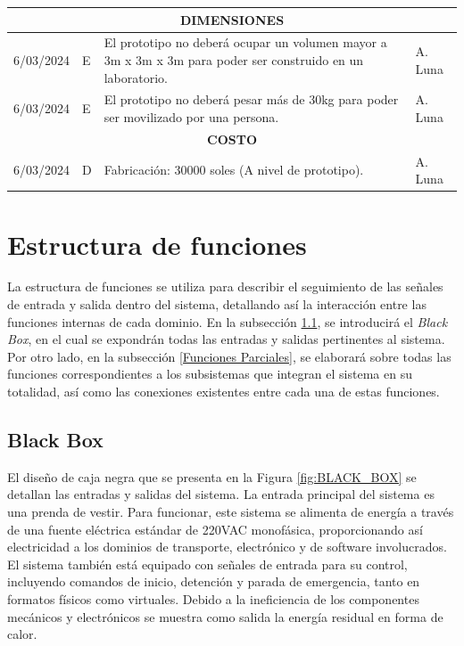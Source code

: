 \begin{longtable}{|c|p{4.5em}|p{22.5em}|p{6em}|}
	\hline
	\multicolumn{4}{|p{37.5em}|}{\textbf{DIMENSIONES}} \bigstrut\\
	\hline
	6/03/2024 & E     & El prototipo no deberá ocupar un volumen mayor a 3m x 3m x 3m para poder ser construido en un laboratorio. & A. Luna \bigstrut\\
	\hline
	6/03/2024 & E     & El prototipo no deberá pesar más de 30kg para poder ser movilizado por una persona. & A. Luna \bigstrut\\
	\hline
	\multicolumn{4}{|p{37.5em}|}{\textbf{COSTO}} \bigstrut\\
	\hline
	6/03/2024 & D     & Fabricación: 30000 soles (A nivel de prototipo). & A. Luna \bigstrut\\
	\hline
\end{longtable}%


\section{Estructura de funciones}

La estructura de funciones se utiliza para describir el seguimiento de las señales de entrada y salida dentro del sistema, detallando así la interacción entre las funciones internas de cada dominio. En la subsección \ref{Black Box}, se introducirá el \textit{Black Box}, en el cual se expondrán todas las entradas y salidas pertinentes al sistema. Por otro lado, en la subsección \ref{Funciones Parciales}, se elaborará sobre todas las funciones correspondientes a los subsistemas que integran el sistema en su totalidad, así como las conexiones existentes entre cada una de estas funciones.

\subsection{Black Box}
\label{Black Box}

El diseño de caja negra que se presenta en la Figura \ref{fig:BLACK_BOX} se detallan las entradas y salidas del sistema. La entrada principal del sistema es una prenda de vestir. Para funcionar, este sistema se alimenta de energía a través de una fuente eléctrica estándar de 220VAC monofásica, proporcionando así electricidad a los dominios de transporte, electrónico y de software involucrados. El sistema también está equipado con señales de entrada para su control, incluyendo comandos de inicio, detención y parada de emergencia, tanto en formatos físicos como virtuales. Debido a la ineficiencia de los componentes mecánicos y electrónicos se muestra como salida la energía residual en forma de calor.

